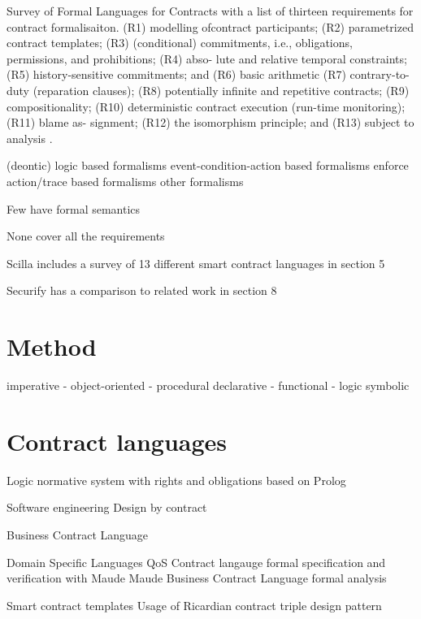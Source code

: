 \documentclass{article}
\begin{document}
Survey of Formal Languages for Contracts with a list of thirteen requirements for contract formalisaiton.
(R1) modelling ofcontract participants; (R2) parametrized contract templates; (R3) (conditional) commitments, i.e., obligations, permissions, and prohibitions; (R4) abso- lute and relative temporal constraints; (R5) history-sensitive commitments; and (R6) basic arithmetic
(R7) contrary-to-duty (reparation clauses); (R8) potentially infinite and repetitive contracts; (R9) compositionality; (R10) deterministic contract execution (run-time monitoring); (R11) blame as- signment; (R12) the isomorphism principle; and (R13) subject to analysis
 \cite{Hvitved2010}.
 
(deontic) logic based formalisms
event-condition-action based formalisms enforce
action/trace based formalisms
other formalisms

Few have formal semantics \cite{Andersen2006} \cite{Kyas2008} \cite{Xu2004}

None cover all the requirements


Scilla includes a survey of 13 different smart contract languages in section 5 \cite{Sergey2018}

Securify has a comparison to related work in section 8 \cite{Tsankov2017}



\section{Method}
\label{method}

imperative
- object-oriented
- procedural
declarative
- functional
- logic
symbolic



\section{Contract languages}
\label{languages}


Logic
normative system with rights and obligations based on Prolog \cite{Michael2010}


Software engineering
Design by contract \cite{Meyer1992}

Business Contract Language \cite{Neal.2003}

Domain Specific Languages
QoS Contract langauge formal specification and verification with Maude \cite{Braga2009} Maude \cite{Clavel2007}
Business Contract Language formal analysis \cite{Governatori2006}


Smart contract templates
Usage of Ricardian contract triple design pattern \cite{Clack2016}
\end{document}
